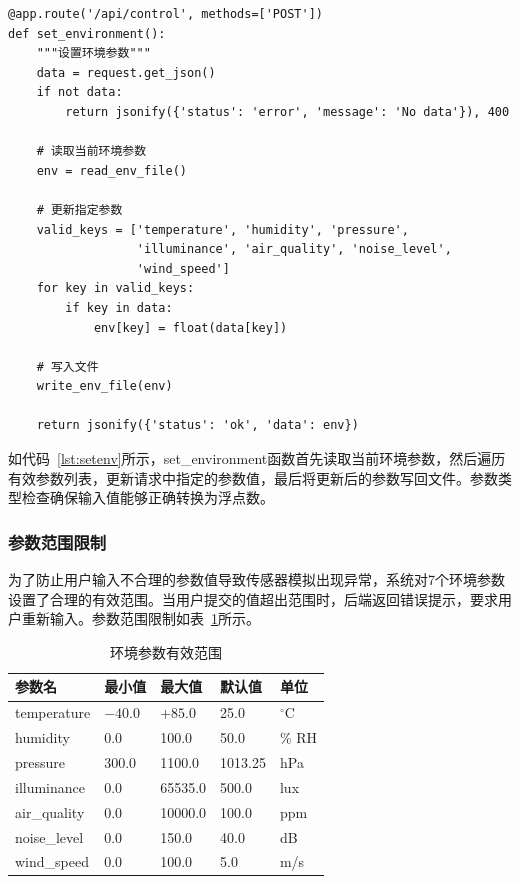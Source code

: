 \documentclass[12pt,a4paper]{ctexart}
\begin{document}
\begin{lstlisting}[caption={环境参数设置接口},label={lst:setenv}]
@app.route('/api/control', methods=['POST'])
def set_environment():
    """设置环境参数"""
    data = request.get_json()
    if not data:
        return jsonify({'status': 'error', 'message': 'No data'}), 400
    
    # 读取当前环境参数
    env = read_env_file()
    
    # 更新指定参数
    valid_keys = ['temperature', 'humidity', 'pressure', 
                  'illuminance', 'air_quality', 'noise_level', 
                  'wind_speed']
    for key in valid_keys:
        if key in data:
            env[key] = float(data[key])
    
    # 写入文件
    write_env_file(env)
    
    return jsonify({'status': 'ok', 'data': env})
\end{lstlisting}

如代码~\ref{lst:setenv}所示，set\_environment函数首先读取当前环境参数，然后遍历有效参数列表，更新请求中指定的参数值，最后将更新后的参数写回文件。参数类型检查确保输入值能够正确转换为浮点数。

\subsubsection{参数范围限制}

为了防止用户输入不合理的参数值导致传感器模拟出现异常，系统对7个环境参数设置了合理的有效范围。当用户提交的值超出范围时，后端返回错误提示，要求用户重新输入。参数范围限制如表~\ref{tab:ranges}所示。

\begin{table}[H]
    \centering
    \caption{环境参数有效范围}
    \label{tab:ranges}
    \begin{tabular}{@{}lllll@{}}
        \toprule
        \textbf{参数名} & \textbf{最小值} & \textbf{最大值} & \textbf{默认值} & \textbf{单位} \\
        \midrule
        temperature & $-40.0$ & $+85.0$ & 25.0 & $^\circ$C \\
        humidity & 0.0 & 100.0 & 50.0 & \% RH \\
        pressure & 300.0 & 1100.0 & 1013.25 & hPa \\
        illuminance & 0.0 & 65535.0 & 500.0 & lux \\
        air\_quality & 0.0 & 10000.0 & 100.0 & ppm \\
        noise\_level & 0.0 & 150.0 & 40.0 & dB \\
        wind\_speed & 0.0 & 100.0 & 5.0 & m/s \\
        \bottomrule
    \end{tabular}
\end{table}
\end{document}
